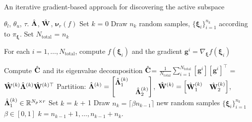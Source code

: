 \bigskip
\begin{breakablealgorithm}
\renewcommand{\algorithmicrequire}{\textbf{Input:}}
\renewcommand{\algorithmicensure}{\textbf{Output:}}
  \caption{An iterative gradient-based approach for discovering the active subspace}
  \begin{algorithmic}[1]
\Require $\theta_l$, $\theta_u$, $\tau$. 
\Ensure $\hat{\mathbf{{\Lambda}}}$, $\hat{\mathbf{{W}}}$, $\bm{\nu}_r(f)$ %
    \State Set $k$ = 0
	\State Draw $n_k$ random samples, $\{\bm{\xi}_i\}_{i=1}^{n_k}$ 
         according to $\pi_{\bm{\xi}}$. 
    \State Set $N_\text{total}$ = $n_k$ 

	\State For each $i=1, \ldots, N_\text{total}$, compute $f(\bm{\xi}_i)$ and the gradient $\bm{g}^i = \nabla_{\bm{\xi}}f(\bm{\xi}_i)$

	\State Compute $\hat{\mathbf{{C}}}$ and its eigenvalue decomposition 
		$\hat{\mathbf{{C}}}$= $\frac{1}{N_\text{total}}\sum\limits_{i=1}^{N_\text{total}}[\bm{g}^i][\bm{g}^i]^\top$ = 
		$\hat{\mathbf{{W}}}^{(k)}\hat{\mathbf{{\Lambda}}}^{(k)} \hat{\mathbf{{W}}}^{(k)\top}$
	\State Partition: $\hat{\mathbf{{\Lambda}}}^{(k)}=
        \begin{bmatrix} \hat{\mathbf{{\Lambda}}}_1^{(k)} & \\ & \hat{\mathbf{{\Lambda}}}_2^{(k)} \end{bmatrix}$, 
        $\hat{\mathbf{{W}}}^{(k)}=\begin{bmatrix} \hat{\mathbf{{W}}}_1^{(k)} & \hat{\mathbf{{W}}}_2^{(k)} \end{bmatrix}$, 
        $\hat{\mathbf{{\Lambda}}}_1^{(k)}\in \mathbb{R}^{N_p\times r}$
	\Loop
		\State Set $k$ = $k$ + 1
		\State Draw $n_k =  \lceil\beta n_{k-1}\rceil$  new random samples 
                $\{\bm{\xi}_i\}_{i=1}^{n_k}$  $\beta\in[0,1]$  $k = n_{k-1}+1,\ldots,n_{k-1}+n_k$.
                

\end{algorithmic}
\end{breakablealgorithm}
